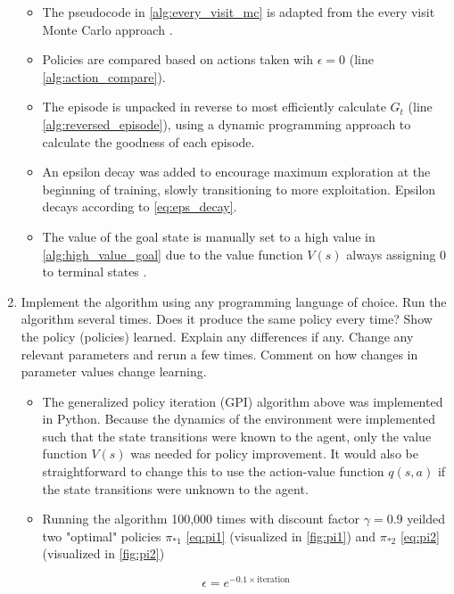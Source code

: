 \documentclass[letterpaper]{article} %
\begin{document}
\begin{enumerate}
	\begin{itemize}
	    \item The pseudocode in \ref{alg:every_visit_mc} is adapted from the every visit Monte Carlo approach \cite{SuttonBartoRLBook}.
	    \item Policies are compared based on actions taken wih $\epsilon=0$ (line \ref{alg:action_compare}).
	    \item The episode is unpacked in reverse to most efficiently calculate $G_t$ (line \ref{alg:reversed_episode}), using a dynamic programming approach to calculate the goodness of each episode.
	    \item An epsilon decay was added to encourage maximum exploration at the beginning of training, slowly transitioning to more exploitation. Epsilon decays according to \ref{eq:eps_decay}.
	    \item The value of the goal state is manually set to a high value in \ref{alg:high_value_goal} due to the value function $V(s)$ always assigning 0 to terminal states \cite{Morales2020GrokkingDL}.
	\end{itemize}

    \item Implement the algorithm using any programming language of choice. Run the algorithm several times. Does it produce the same policy every time? Show the policy (policies) learned. Explain any differences if any. Change any relevant parameters and rerun a few times. Comment on how changes in parameter values change learning.
	\begin{itemize}
	    \item The generalized policy iteration (GPI) algorithm above was implemented in Python. Because the dynamics of the environment were implemented such that the state transitions were known to the agent, only the value function $V(s)$ was needed for policy improvement. It would also be straightforward to change this to use the action-value function $q(s, a)$ if the state transitions were unknown to the agent.
	    \item Running the algorithm 100,000 times with discount factor $\gamma=0.9$ yeilded two "optimal" policies $\pi_{*1}$ \ref{eq:pi1} (visualized in \ref{fig:pi1}) and $\pi_{*2}$ \ref{eq:pi2} (visualized in \ref{fig:pi2})

	    \begin{equation}
		\label{eq:eps_decay}
		\epsilon = e^{-0.1 \times \text{iteration}}
	    \end{equation}


\end{itemize}
\end{enumerate}
\end{document}
